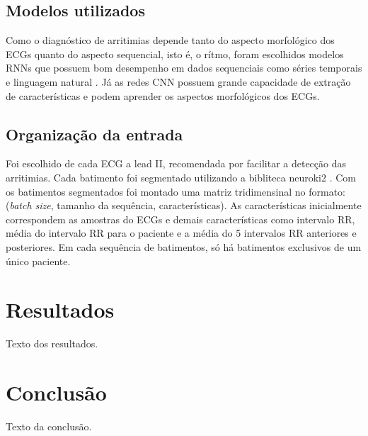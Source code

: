 \documentclass[
    12pt,                %
    openright,           %
    oneside,             %
    a4paper,             %
    brazil               %
]{abntex2}
\begin{document}
\section{Modelos utilizados}

Como o diagnóstico de arritimias depende tanto do aspecto morfológico dos ECGs quanto do aspecto sequencial, isto é, o rítmo, foram escolhidos modelos RNNs que possuem
bom desempenho em dados sequenciais como séries temporais e linguagem natural \cite{james2023}. Já as redes CNN possuem grande capacidade de extração de características
e podem aprender os aspectos morfológicos dos ECGs. 



\section{Organização da entrada}

Foi escolhido de cada ECG a lead II, recomendada por facilitar a detecção das arritimias. 
Cada batimento foi segmentado utilizando a bibliteca neuroki2 \cite{Makowski2021neurokit}.
Com os batimentos segmentados foi montado uma matriz tridimensinal no formato: (\textit{batch size}, tamanho da sequência, características). As características inicialmente correspondem as amostras do ECGs e demais 
características como intervalo RR, média do intervalo RR para o paciente e a média do 5 intervalos RR anteriores e posteriores. Em cada sequência de batimentos, só há batimentos exclusivos de um
único paciente.



\chapter{Resultados}
Texto dos resultados.

\chapter{Conclusão}
Texto da conclusão.



\end{document}
